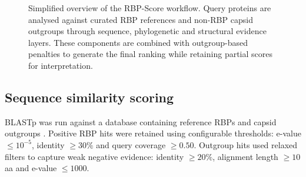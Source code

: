 \documentclass[runningheads]{llncs}
\begin{document}
\begin{figure}[htbp]
\centering
{}
\caption{Simplified overview of the RBP-Score workflow. Query proteins are analysed against curated RBP references and non-RBP capsid outgroups through sequence, phylogenetic and structural evidence layers. These components are combined with outgroup-based penalties to generate the final ranking while retaining partial scores for interpretation.}
\label{fig:workflow}
\end{figure}

\subsection{Sequence similarity scoring}

BLASTp was run against a database containing reference RBPs and capsid outgroups \cite{altschul1990}. Positive RBP hits were retained using configurable thresholds: e-value $\leq10^{-5}$, identity $\geq30\%$ and query coverage $\geq0.50$. Outgroup hits used relaxed filters to capture weak negative evidence: identity $\geq20\%$, alignment length $\geq10$ aa and e-value $\leq1000$.
\end{document}
